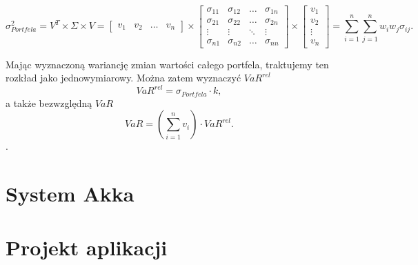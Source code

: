 \documentclass[11pt,titlepage]{article}
\begin{document}
$$ \sigma_{Portfela}^2 = V^T  \times \Sigma \times V =  \begin{bmatrix}
 v_1 & v_2 & \hdots & v_n
\end{bmatrix} 
\times
\begin{bmatrix}
\sigma_{11} & \sigma_{12} & \hdots & \sigma_{1n} \\ 
\sigma_{21} & \sigma_{22} & \hdots & \sigma_{2n} \\
\vdots & \vdots & \ddots & \vdots\\
\sigma_{n1} & \sigma_{n2} & \hdots & \sigma_{nn}
\end{bmatrix}  
\times
\begin{bmatrix}
 v_1 \\ 
 v_2 \\
\vdots \\
v_n
\end{bmatrix}
=\sum_{i=1}^{n}\sum_{j=1}^{n}w_i w_j \sigma_{ij}.
$$


Mając wyznaczoną wariancję zmian wartości całego portfela, traktujemy ten rozkład jako jednowymiarowy. Można zatem wyznaczyć $VaR^{rel}$
$$VaR^{rel}=\sigma_{Portfela} \cdot k,$$
a także bezwzględną $VaR$
$$VaR = (\sum_{i=1}^{n}v_i) \cdot VaR^{rel}.$$.













 











\newpage
\section{System Akka}


\section{Projekt aplikacji}


\newpage














\end{document}
